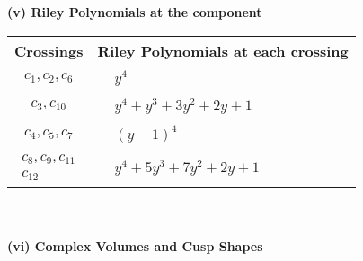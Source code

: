 \documentclass[1p]{elsarticle_modified}
\theoremstyle{definition}
\begin{document}
\newpage\renewcommand{\arraystretch}{1}
\flushleft \textbf{(v) Riley Polynomials at the component}\newline \\
\begin{tabular}{m{50pt}|m{274pt}}
Crossings & \hspace{64pt}Riley Polynomials at each crossing \\
\hline $$\begin{aligned}c_{1},c_{2},c_{6}\end{aligned}$$&$\begin{aligned}
&y^4
\end{aligned}$\\
\hline $$\begin{aligned}c_{3},c_{10}\end{aligned}$$&$\begin{aligned}
&y^4+y^3+3 y^2+2 y+1
\end{aligned}$\\
\hline $$\begin{aligned}c_{4},c_{5},c_{7}\end{aligned}$$&$\begin{aligned}
&(y-1)^4
\end{aligned}$\\
\hline $$\begin{aligned}c_{8},c_{9},c_{11}\\c_{12}\end{aligned}$$&$\begin{aligned}
&y^4+5 y^3+7 y^2+2 y+1
\end{aligned}$\\
\hline
\end{tabular}\\~\\
\newpage\flushleft \textbf{(vi) Complex Volumes and Cusp Shapes}
\end{document}
